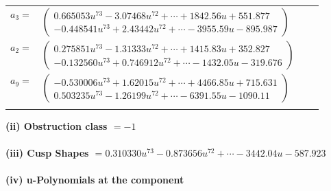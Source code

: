\documentclass[1p]{elsarticle_modified}
\theoremstyle{definition}
\begin{document}
\begin{tabular}{m{7pt} m{180pt} m{7pt} m{180pt} }
\flushright $a_{3}=$&$\begin{pmatrix}0.665053 u^{73}-3.07468 u^{72}+\cdots+1842.56 u+551.877\\-0.448541 u^{73}+2.43442 u^{72}+\cdots-3955.59 u-895.987\end{pmatrix}$ \\
\flushright $a_{2}=$&$\begin{pmatrix}0.275851 u^{73}-1.31333 u^{72}+\cdots+1415.83 u+352.827\\-0.132560 u^{73}+0.746912 u^{72}+\cdots-1432.05 u-319.676\end{pmatrix}$ \\
\flushright $a_{9}=$&$\begin{pmatrix}-0.530006 u^{73}+1.62015 u^{72}+\cdots+4466.85 u+715.631\\0.503235 u^{73}-1.26199 u^{72}+\cdots-6391.55 u-1090.11\end{pmatrix}$\\&\end{tabular}
\flushleft \textbf{(ii) Obstruction class $= -1$}\\~\\
\flushleft \textbf{(iii) Cusp Shapes $= 0.310330 u^{73}-0.873656 u^{72}+\cdots-3442.04 u-587.923$}\\~\\
\newpage\renewcommand{\arraystretch}{1}
\flushleft \textbf{(iv) u-Polynomials at the component}\newline \\
\end{document}

